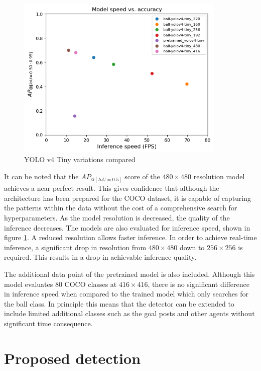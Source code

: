 \documentclass[a4paper,twoside,12pt]{report}
\begin{document}
\begin{figure}[h!]
\begin{center}
\includegraphics[width=10cm]{images/yolov4tiny_compare.png}
\caption{YOLO v4 Tiny variations compared}
\label{fig:yolov4tiny_compare}
\end{center}
\end{figure}

It can be noted that the $AP_{@[IoU=0.5]}$ score of the $480 \times 480$ resolution model achieves a near perfect result. This gives confidence that although the architecture has been prepared for the COCO dataset, it is capable of capturing the patterns within the data without the cost of a comprehensive search for hyperparameters. As the model resolution is decreased, the quality of the inference decreases. The models are also evaluated for inference speed, shown in figure \ref{fig:yolov4tiny_compare}. A reduced resolution allows faster inference. In order to achieve real-time inference, a significant drop in resolution from $480 \times 480$ down to $256 \times 256$ is required. This results in a drop in achievable inference quality.

The additional data point of the pretrained model is also included. Although this model evaluates 80 COCO classes at $416 \times 416$, there is no significant difference in inference speed when compared to the trained model which only searches for the ball class. In principle this means that the detector can be extended to include limited additional classes such as the goal posts and other agents without significant time consequence.

\section{Proposed detection}
\end{document}
